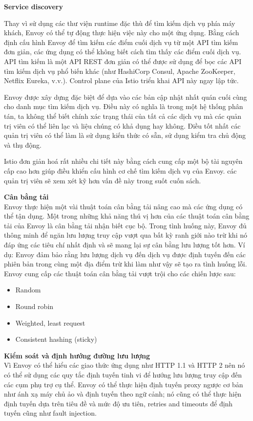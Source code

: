 \documentclass[12pt,a4paper]{report}
\begin{document}
		\textbf{Service discovery}
		
		Thay vì sử dụng các thư viện runtime đặc thù để tìm kiếm dịch vụ phía máy khách, Envoy có thể tự động thực hiện việc này cho một ứng dụng. Bằng cách định cấu hình Envoy để tìm kiếm các điểm cuối dịch vụ từ một API tìm kiếm đơn giản, các ứng dụng có thể không biết cách tìm thấy các điểm cuối dịch vụ. API tìm kiếm là một API REST đơn giản có thể được sử dụng để bọc các API tìm kiếm dịch vụ phổ biến khác (như HashiCorp Consul, Apache ZooKeeper, Netflix Eureka, v.v.). Control plane của Istio triển khai API này ngay lập tức.
		
		Envoy được xây dựng đặc biệt để dựa vào các bản cập nhật nhất quán cuối cùng cho danh mục tìm kiếm dịch vụ. Điều này có nghĩa là trong một hệ thống phân tán, ta không thể biết chính xác trạng thái của tất cả các dịch vụ mà các quản trị viên có thể liên lạc và liệu chúng có khả dụng hay không. Điều tốt nhất các quản trị viên có thể làm là sử dụng kiến thức có sẵn, sử dụng kiểm tra chủ động và thụ động.
		
		Istio đơn giản hoá rất nhiều chi tiết này bằng cách cung cấp một bộ tài nguyên cấp cao hơn giúp điều khiển cấu hình cơ chế tìm kiếm dịch vụ của Envoy. các quản trị viên sẽ xem xét kỹ hơn vấn đề này trong suốt cuốn sách.
		
		\textbf{Cân bằng tải}\\
		\hspace{0.6cm}Envoy thực hiện một vài thuật toán cân bằng tải nâng cao mà các ứng dụng có thể tận dụng. Một trong những khả năng thú vị hơn của các thuật toán cân bằng tải của Envoy là cân bằng tải nhận biết cục bộ. Trong tình huống này, Envoy đủ thông minh để ngăn lưu lượng truy cập vượt qua bất kỳ ranh giới nào trừ khi nó đáp ứng các tiêu chí nhất định và sẽ mang lại sự cân bằng lưu lượng tốt hơn. Ví dụ: Envoy đảm bảo rằng lưu lượng dịch vụ đến dịch vụ được định tuyến đến các phiên bản trong cùng một địa điểm trừ khi làm như vậy sẽ tạo ra tình huống lỗi. Envoy cung cấp các thuật toán cân bằng tải vượt trội cho các chiến lược sau:
		\begin{itemize}
			\item 		Random
			\item 		Round robin
			\item 		Weighted, least request
			\item 		Consistent hashing (sticky) 
		\end{itemize}		
		
		\textbf{Kiểm soát và định hướng đường lưu lượng}\\
		Vì Envoy có thể hiểu các giao thức ứng dụng như HTTP 1.1 và HTTP 2 nên nó có thể sử dụng các quy tắc định tuyến tinh vi để hướng lưu lượng truy cập đến các cụm phụ trợ cụ thể. Envoy có thể thực hiện định tuyến proxy ngược cơ bản như ánh xạ máy chủ ảo và định tuyến theo ngữ cảnh; nó cũng có thể thực hiện định tuyến dựa trên tiêu đề và mức độ ưu tiên, retries and timeouts để định tuyến cũng như fault injection.
		
\end{document}
